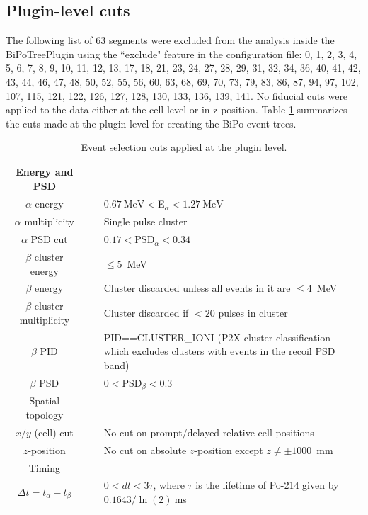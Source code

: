 \subsection{Plugin-level cuts}
The following list of 63 segments were excluded from the analysis inside the BiPoTreePlugin using the ``exclude" feature in the configuration file: 0, 1, 2, 3, 4, 5, 6, 7, 8, 9, 10, 11, 12, 13, 17, 18, 21, 23, 24, 27, 28, 29, 31, 32, 34, 36, 40, 41, 42, 43, 44, 46, 47, 48, 50, 52, 55, 56, 60, 63, 68, 69, 70, 73, 79, 83, 86, 87, 94, 97, 102, 107, 115, 121, 122, 126, 127, 128, 130, 133, 136, 139, 141. No fiducial cuts were applied to the data either at the cell level or in z-position.
Table \ref{tab:plugincuts} summarizes the cuts made at the plugin level for creating the BiPo event trees.
\begin{table}
\begin{center}
\caption{\label{tab:plugincuts}Event selection cuts applied at the plugin level.}
\begin{tabular}[ht]{c c p{10.5cm}}\hline
Energy and PSD&~&~\\\hline\hline
$\alpha$ energy &\vline& $0.67~\textrm{MeV}<$E$_{\alpha}<1.27~\textrm{MeV}$\\
$\alpha$ multiplicity &\vline& Single pulse cluster\\
$\alpha$ PSD cut& \vline&$0.17<$PSD$_{\alpha}<0.34$\\
$\beta$ cluster energy &\vline& $\leq 5$~MeV\\
$\beta$ energy & \vline&Cluster discarded unless all events in it are $\leq 4$~MeV\\
$\beta$ cluster multiplicity & \vline&Cluster discarded if $<20$ pulses in cluster\\
$\beta$ PID & \vline&PID==CLUSTER\_IONI (P2X cluster classification which excludes clusters with events in the recoil PSD band)\\
$\beta$ PSD & \vline&$0<\textrm{PSD}_{\beta}<0.3$\\\hline
Spatial topology&~&~\\\hline\hline
$x/y$ (cell) cut &\vline& No cut on prompt/delayed relative cell positions\\
$z$-position&\vline& No cut on absolute $z$-position except $z\neq \pm1000$~mm\\
Timing&~&~\\\hline\hline	
$\Delta t=t_{\alpha}-t_{\beta}$&\vline &$0< dt < 3\tau$, where $\tau$ is the lifetime of Po-214 given by $0.1643/\ln{(2)}~$ms\\\hline

\end{tabular}
\end{center}
\end{table}
